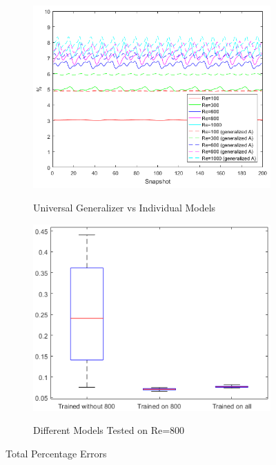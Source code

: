 \documentclass[letterpaper,12pt,peerreviewca,draftcls]{IEEEtran}
\begin{document}
\begin{figure}[h] %
	\centering
	\begin{subfigure}[t]{0.7\textwidth}
		\includegraphics[width=\linewidth]{"Figure S8a"}
		\label{fig:errors}	
		\caption{Universal Generalizer vs Individual Models}
	\end{subfigure}
	\begin{subfigure}[t]{0.6\textwidth}
		\includegraphics[width=\linewidth]{"Figure S8b"}
		\label{fig:errors_boxplot}	
		\caption{Different Models Tested on Re=800}
	\end{subfigure}
	\caption{Total Percentage Errors}
\end{figure}
\end{document}

